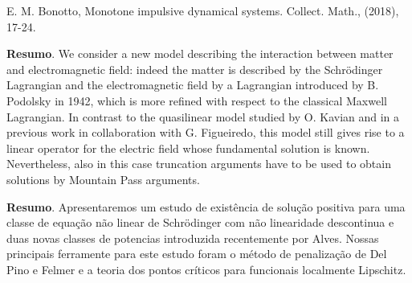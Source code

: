 	\begin{thebibliography}{999}
		 E. M. Bonotto, Monotone impulsive dynamical systems. Collect. Math., (2018), 17-24.
	\end{thebibliography}
	
	\vspace{24pt}
	
	
	\noindent\textbf{Resumo}.\label{gs} 
	We consider a new model describing the  interaction between matter and electromagnetic field: indeed the matter is described by the Schrödinger Lagrangian and the electromagnetic field by a  Lagrangian introduced by B. Podolsky in 1942, which is more refined with respect to the classical Maxwell Lagrangian. In contrast to the quasilinear model studied by O. Kavian and in a previous work in collaboration with G. Figueiredo, this model still gives rise to a linear operator for the electric field whose fundamental solution is known. Nevertheless, also in this case truncation arguments have to be used  to obtain solutions by Mountain Pass arguments.
	
	\vspace{24pt}

	
	
	\noindent\textbf{Resumo}.\label{gcgs} 
	Apresentaremos um estudo de existência de solução positiva para uma classe de equação não linear de Schrödinger com não linearidade descontinua e duas novas classes de potencias introduzida recentemente por Alves. Nossas principais ferramente para este estudo foram o método de penalização de Del Pino e Felmer e a teoria dos pontos críticos para funcionais localmente Lipschitz. 
	
	\vspace{24pt}
	
